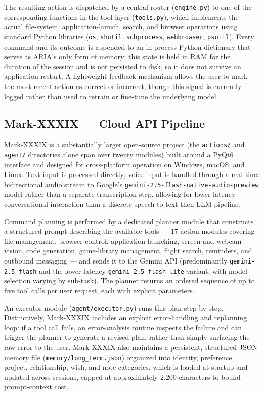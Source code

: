 \documentclass[conference]{IEEEtran}
\begin{document}
The resulting action is dispatched by a central router (\texttt{engine.py}) to one of the corresponding functions in the tool layer (\texttt{tools.py}), which implements the actual file-system, application-launch, search, and browser operations using standard Python libraries (\texttt{os}, \texttt{shutil}, \texttt{subprocess}, \texttt{webbrowser}, \texttt{psutil}). Every command and its outcome is appended to an in-process Python dictionary that serves as ARIA's only form of memory; this state is held in RAM for the duration of the session and is not persisted to disk, so it does not survive an application restart. A lightweight feedback mechanism allows the user to mark the most recent action as correct or incorrect, though this signal is currently logged rather than used to retrain or fine-tune the underlying model.

\subsection{Mark-XXXIX --- Cloud API Pipeline}

Mark-XXXIX is a substantially larger open-source project (the \texttt{actions/} and \texttt{agent/} directories alone span over twenty modules) built around a PyQt6 interface and designed for cross-platform operation on Windows, macOS, and Linux. Text input is processed directly; voice input is handled through a real-time bidirectional audio stream to Google's \texttt{gemini-2.5-flash-native-audio-preview} model rather than a separate transcription step, allowing for lower-latency conversational interaction than a discrete speech-to-text-then-LLM pipeline.

Command planning is performed by a dedicated planner module that constructs a structured prompt describing the available tools --- 17 action modules covering file management, browser control, application launching, screen and webcam vision, code generation, game-library management, flight search, reminders, and outbound messaging --- and sends it to the Gemini API (predominantly \texttt{gemini-2.5-flash} and the lower-latency \texttt{gemini-2.5-flash-lite} variant, with model selection varying by sub-task). The planner returns an ordered sequence of up to five tool calls per user request, each with explicit parameters.

An executor module (\texttt{agent/executor.py}) runs this plan step by step. Distinctively, Mark-XXXIX includes an explicit error-handling and replanning loop: if a tool call fails, an error-analysis routine inspects the failure and can trigger the planner to generate a revised plan, rather than simply surfacing the raw error to the user. Mark-XXXIX also maintains a persistent, structured JSON memory file (\texttt{memory/long\_term.json}) organized into identity, preference, project, relationship, wish, and note categories, which is loaded at startup and updated across sessions, capped at approximately 2,200 characters to bound prompt-context cost.
\end{document}
